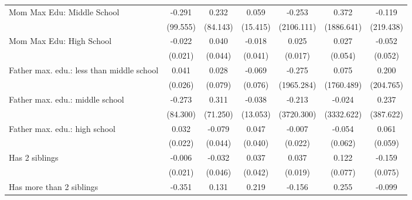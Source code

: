 {\begin{tabular}{l*{6}{c}}
\addlinespace
Mom Max Edu: Middle School&      -0.291         &       0.232         &       0.059         &      -0.253         &       0.372         &      -0.119         \\
                    &    (99.555)         &    (84.143)         &    (15.415)         &  (2106.111)         &  (1886.641)         &   (219.438)         \\
\addlinespace
Mom Max Edu: High School&      -0.022         &       0.040         &      -0.018         &       0.025         &       0.027         &      -0.052         \\
                    &     (0.021)         &     (0.044)         &     (0.041)         &     (0.017)         &     (0.054)         &     (0.052)         \\
\addlinespace
Father max. edu.: less than middle school&       0.041         &       0.028         &      -0.069         &      -0.275         &       0.075         &       0.200         \\
                    &     (0.026)         &     (0.079)         &     (0.076)         &  (1965.284)         &  (1760.489)         &   (204.765)         \\
\addlinespace
Father max. edu.: middle school&      -0.273         &       0.311         &      -0.038         &      -0.213         &      -0.024         &       0.237         \\
                    &    (84.300)         &    (71.250)         &    (13.053)         &  (3720.300)         &  (3332.622)         &   (387.622)         \\
\addlinespace
Father max. edu.: high school&       0.032         &      -0.079         &       0.047         &      -0.007         &      -0.054         &       0.061         \\
                    &     (0.022)         &     (0.044)         &     (0.040)         &     (0.022)         &     (0.062)         &     (0.059)         \\
\addlinespace
Has 2 siblings      &      -0.006         &      -0.032         &       0.037         &       0.037         &       0.122         &      -0.159\sym{*}  \\
                    &     (0.021)         &     (0.046)         &     (0.042)         &     (0.019)         &     (0.077)         &     (0.075)         \\
\addlinespace
Has more than 2 siblings&      -0.351         &       0.131         &       0.219         &      -0.156         &       0.255         &      -0.099         \\

\end{tabular}}
